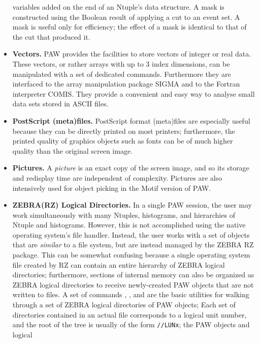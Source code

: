 \begin{itemize}
      variables added on the end of an Ntuple's data structure. A mask is 
      constructed using the Boolean result of applying a cut to an event set.
      A mask is useful only for efficiency; the effect of a mask is identical 
      to that of the cut that produced it.
\item {\bf Vectors.}  
      PAW provides the facilities to store vectors of integer or real data. 
      These vectors, or rather arrays with up to 3 index dimensions, can be 
      manipulated with a set of dedicated commands. Furthermore they are 
      interfaced to the array manipulation package SIGMA and to the Fortran 
      interpreter COMIS. They provide a convenient and easy way to analyse 
      small data sets stored in ASCII files.
\item {\bf PostScript (meta)files.}  
      PostScript format (meta)files are especially useful because they can be 
      directly printed on most printers; furthermore, the printed quality of 
      graphics objects such as fonts can be of much higher quality than the 
      original screen image.
\item {\bf Pictures.}  
      A {\it picture\/} is an exact copy of the screen image, and so its
      storage and redisplay time are independent of complexity. Pictures are 
      also intensively used for object picking in the Motif version of PAW.
\item {\bf ZEBRA(RZ) Logical Directories.}  
      In a single PAW session, the user may work simultaneously with many 
      Ntuples, histograms, and hierarchies of Ntuple and histograms. However, 
      this is not accomplished using the native operating system's file handler.
      Instead, the user works with a set of objects that are {\it similar\/} to
      a file system, but are instead managed by the ZEBRA RZ package. This can
      be somewhat confusing because a single operating system file created by 
      RZ can contain an entire hierarchy of ZEBRA logical directories; 
      furthermore, sections of internal memory can also be organized as ZEBRA 
      logical directories to receive newly-created PAW objects that are not 
      written to files. A set of commands , , and 
       are the basic utilities for walking through a set of ZEBRA 
      logical directories of PAW objects; Each set of directories contained in
      an actual file corresponds to a logical unit number, and the root of the
      tree is usually of the form \texttt{//LUNx};  the PAW objects and logical

\end{itemize}
